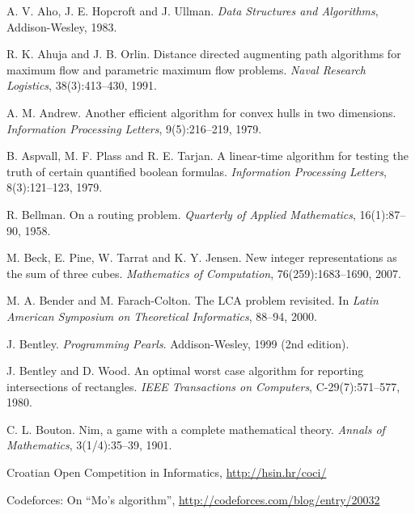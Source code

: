 
\begin{thebibliography}{9}
    A. V. Aho, J. E. Hopcroft and J. Ullman.
    \emph{Data Structures and Algorithms},
    Addison-Wesley, 1983.

    R. K. Ahuja and J. B. Orlin.
    Distance directed augmenting path algorithms for maximum flow and parametric maximum flow problems.
    \emph{Naval Research Logistics}, 38(3):413--430, 1991.

    A. M. Andrew.
    Another efficient algorithm for convex hulls in two dimensions.
    \emph{Information Processing Letters}, 9(5):216--219, 1979.

    B. Aspvall, M. F. Plass and R. E. Tarjan.
    A linear-time algorithm for testing the truth of certain quantified boolean formulas.
    \emph{Information Processing Letters}, 8(3):121--123, 1979.

    R. Bellman.
    On a routing problem.
    \emph{Quarterly of Applied Mathematics}, 16(1):87--90, 1958.

    M. Beck, E. Pine, W. Tarrat and K. Y. Jensen.
    New integer representations as the sum of three cubes.
    \emph{Mathematics of Computation}, 76(259):1683--1690, 2007.

    M. A. Bender and M. Farach-Colton.
    The LCA problem revisited. In
    \emph{Latin American Symposium on Theoretical Informatics}, 88--94, 2000.

    J. Bentley.
    \emph{Programming Pearls}.
    Addison-Wesley, 1999 (2nd edition).

    J. Bentley and D. Wood.
    An optimal worst case algorithm for reporting intersections of rectangles.
    \emph{IEEE Transactions on Computers}, C-29(7):571--577, 1980.

    C. L. Bouton.
    Nim, a game with a complete mathematical theory.
    \emph{Annals of Mathematics}, 3(1/4):35--39, 1901.


    Croatian Open Competition in Informatics, \url{http://hsin.hr/coci/}

    Codeforces: On ``Mo's algorithm'',
    \url{http://codeforces.com/blog/entry/20032}


\end{thebibliography}
